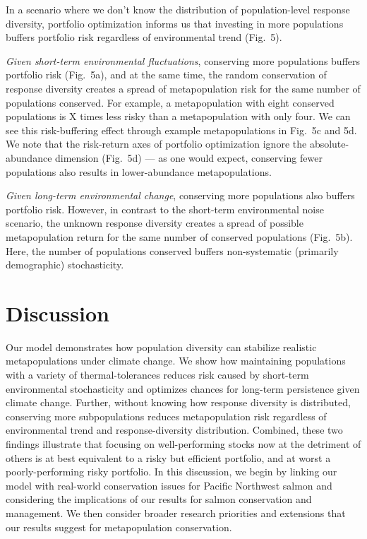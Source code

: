 In a scenario where we don't know the distribution of population-level response diversity, portfolio optimization informs us that investing in more populations buffers portfolio risk regardless of environmental trend (Fig.~5).

\emph{Given short-term environmental fluctuations}, conserving more populations buffers portfolio risk (Fig.~5a), and at the same time, the random conservation of response diversity creates a spread of metapopulation risk for the same number of populations conserved. For example, a metapopulation with eight conserved populations is X times less risky than a metapopulation with only four. We can see this risk-buffering effect through example metapopulations in Fig.~5c and 5d. We note that the risk-return axes of portfolio optimization ignore the absolute-abundance dimension (Fig.~5d) --- as one would expect, conserving fewer populations also results in lower-abundance metapopulations.

\emph{Given long-term environmental change}, conserving more populations also buffers portfolio risk. However, in contrast to the short-term environmental noise scenario, the unknown response diversity creates a spread of possible metapopulation return for the same number of conserved populations (Fig.~5b). Here, the number of populations conserved buffers non-systematic (primarily demographic) stochasticity.

\section{Discussion}

Our model demonstrates how population diversity can stabilize realistic metapopulations under climate change. We show how maintaining populations with a variety of thermal-tolerances reduces risk caused by short-term environmental stochasticity and optimizes chances for long-term persistence given climate change. Further, without knowing how response diversity is distributed, conserving more subpopulations reduces metapopulation risk regardless of environmental trend and response-diversity distribution. Combined, these two findings illustrate that focusing on well-performing stocks now at the detriment of others is at best equivalent to a risky but efficient portfolio, and at worst a poorly-performing risky portfolio. In this discussion, we begin by linking our model with real-world conservation issues for Pacific Northwest salmon and considering the implications of our results for salmon conservation and management. We then consider broader research priorities and extensions that our results suggest for metapopulation conservation.


